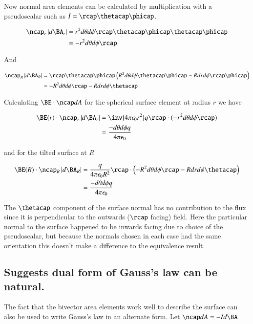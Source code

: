 Now normal area elements can be calculated by multiplication with a  pseudoscalar such as $I = \rcap \thetacap \phicap$.

\begin{align*}
\ncap_r \Abs{d\BA_r}
&= r^2 d\theta d\phi \rcap \thetacap \phicap \thetacap\phicap \\
&= -r^2 d\theta d\phi \rcap \\
\end{align*}

And

\begin{align*}
\ncap_R \Abs{d\BA_R}
&= \rcap \thetacap \phicap \left( R^2 d\theta d\phi \thetacap \phicap - R dr d\phi \rcap \phicap \right) \\
&= - R^2 d\theta d\phi \rcap - R dr d\phi \thetacap
\end{align*}

Calculating $\BE \cdot \ncap dA$ for the spherical surface element at radius $r$ we have

\begin{align*}
\BE(r) \cdot \ncap_r \Abs{d\BA_r}
&= \inv{4 \pi \epsilon_0 r^2} q \rcap \cdot (-r^2 d\theta d\phi \rcap) \\
&= \frac{-d\theta d\phi q}{4 \pi \epsilon_0}
\end{align*}

and for the tilted surface at $R$ 

\begin{align*}
\BE(R) \cdot \ncap_R \Abs{d\BA_R}
&= \frac{q}{4 \pi \epsilon_0 R^2} \rcap \cdot \left(- R^2 d\theta d\phi \rcap - R dr d\phi \thetacap \right) \\
&= \frac{-d\theta d\phi q}{4 \pi \epsilon_0}
\end{align*}

The $\thetacap$ component of the surface normal has no contribution to the flux since it is perpendicular to the outwards ($\rcap$ facing) field.  Here the particular normal to the surface happened to be inwards facing due to choice of the pseudoscalar, but because the normals chosen in each case had the same orientation this doesn't make a difference to the equivalence result.

\subsection{Suggests dual form of Gauss's law can be natural. }

The fact that the bivector area elements work well to describe the surface
can also be used to write Gauss's law in an alternate form.  Let $\ncap dA = -I d\BA$

